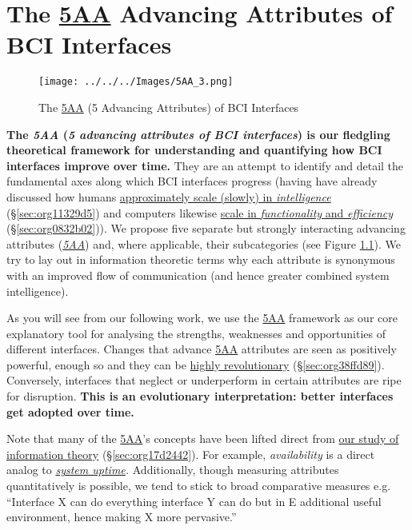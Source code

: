\documentclass[logo,bsc,singlespacing,parskip]{infthesis}
\begin{document}
\chapter{The \hyperref[orgce96c46]{5AA} Advancing Attributes of BCI Interfaces}
\label{sec:org11eb39c}
\begin{figure}[H]
\centering
\texttt{[image: ../../../Images/5AA\_3.png]}
\caption{\label{fig:5AA}The \hyperref[orgce96c46]{5AA} (5 Advancing Attributes) of BCI Interfaces}
\end{figure}

\textbf{The \emph{\label{orgce96c46}5AA} (\emph{5 advancing attributes of BCI interfaces}) is our fledgling theoretical framework for understanding and quantifying how BCI interfaces improve over time.}
They are an attempt to identify and detail the fundamental axes along which BCI interfaces progress (having have already discussed how humans \hyperref[sec:org11329d5]{approximately scale (slowly) in \emph{intelligence}} (\S \ref{sec:org11329d5}) and computers likewise \hyperref[sec:org0832b02]{scale in \emph{functionality} and \emph{efficiency}} (\S \ref{sec:org0832b02})).
We propose five separate but strongly interacting advancing attributes (\emph{\hyperref[orgce96c46]{5AA}}) and, where applicable, their subcategories (see Figure \ref{fig:5AA}).
We try to lay out in information theoretic terms why each attribute is synonymous with an improved flow of communication (and hence greater combined system intelligence).

As you will see from our following work, we use the \hyperref[orgce96c46]{5AA} framework as our core explanatory tool for analysing the strengths, weaknesses and opportunities of different interfaces.
Changes that advance \hyperref[orgce96c46]{5AA} attributes are seen as positively powerful, enough so and they can be \hyperref[sec:org38ffd89]{highly revolutionary} (\S \ref{sec:org38ffd89}).
Conversely, interfaces that neglect or underperform in certain attributes are ripe for disruption.
\textbf{This is an evolutionary interpretation: better interfaces get adopted over time.}

Note that many of the \hyperref[orgce96c46]{5AA}'s concepts have been lifted direct from \hyperref[sec:org17d2442]{our study of information theory} (\S \ref{sec:org17d2442}).
For example, \emph{availability} is a direct analog to \emph{\hyperref[org187665d]{system uptime}.}
Additionally, though measuring attributes quantitatively is possible, we tend to stick to broad comparative measures e.g. ``Interface X can do everything interface Y can do but in E additional useful environment, hence making X more pervasive.''
\end{document}

